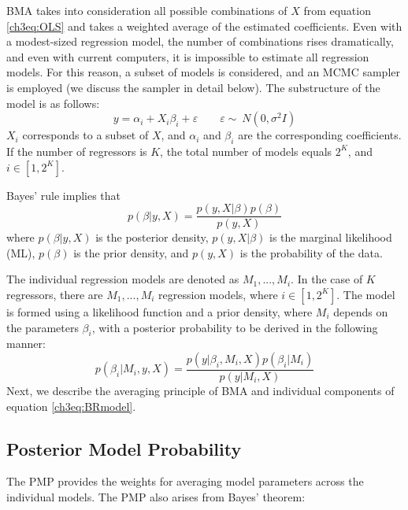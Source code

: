 \begin{refsection}
\begin{subappendices}
    \ac{BMA} takes into consideration all possible combinations of $X$ from equation \ref{ch3eq:OLS} and takes a weighted average of the estimated coefficients. Even with a modest-sized regression model, the number of combinations rises dramatically, and even with current computers, it is impossible to estimate all regression models. For this reason, a subset of models is considered, and an \ac{MCMC} sampler is employed (we discuss the sampler in detail below). The substructure of the model is as follows:
    \begin{equation}\label{ch3eq:OLSsub}
    y = \alpha_{i} + X_{i}\beta_{i}+ \varepsilon \qquad \varepsilon  \sim\ N(0, \sigma^{2}I)
    \end{equation}
    $X_{i}$ corresponds to a subset of $X$, and $\alpha_{i} $ and $ \beta_{i}$ are the corresponding coefficients. If the number of regressors is $K$, the total number of models equals $2^{K}$, and $i \in [1,2^{K}]$. 
    
    Bayes' rule implies that
    \begin{equation}\label{ch3eq:BRmodel}
    p(\beta \vert y,X) = \frac{p(y,X\vert \beta)p(\beta)}{p(y,X)}
    \end{equation}
    where $p(\beta \vert y, X)$ is the posterior density, $p(y, X\vert \beta)$ is the marginal likelihood (ML), $p(\beta)$ is the prior density, and $p(y,X)$ is the probability of the data. 
    
    The individual regression models are denoted as $M_{1},...,M_{i}$. In the case of $K$ regressors, there are $M_{1},...,M_{i}$ regression models, where $i \in [1,2^{K}]$. The model is formed using a likelihood function and a prior density, where $M_{i}$ depends on the parameters $\beta_{i}$, with a posterior probability to be derived in the following manner:
    \begin{equation}\label{ch3eq:BROM}
    p(\beta_{i} \vert M_{i},y,X) = \frac{p(y\vert \beta_{i},M_{i},X)p(\beta_{i}\vert M_{i})}{p(y \vert M_{i},X)}
    \end{equation}
    Next, we describe the averaging principle of \ac{BMA} and individual components of equation \ref{ch3eq:BRmodel}.
    \subsection*{Posterior Model Probability}
    The \ac{PMP} provides the weights for averaging model parameters across the individual models. The \ac{PMP} also arises from Bayes' theorem:
    

\end{subappendices}
\end{refsection}
